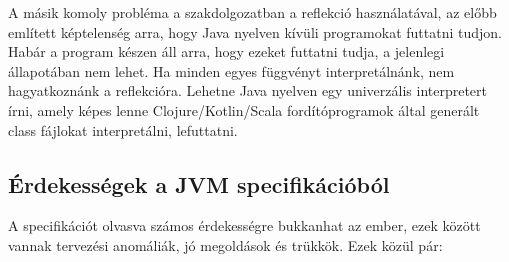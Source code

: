 A másik komoly probléma a szakdolgozatban a reflekció használatával, az előbb említett képtelenség arra, hogy Java nyelven kívüli programokat futtatni tudjon. Habár a program készen áll arra, hogy ezeket futtatni tudja, a jelenlegi állapotában nem lehet. Ha minden egyes függvényt interpretálnánk, nem hagyatkoznánk a reflekcióra. Lehetne Java nyelven egy univerzális interpretert írni, amely képes lenne Clojure/Kotlin/Scala fordítóprogramok által generált class fájlokat interpretálni, lefuttatni.

\subsection{Érdekességek a JVM specifikációból}

A specifikációt olvasva számos érdekességre bukkanhat az ember, ezek között vannak tervezési anomáliák, jó megoldások és trükkök. Ezek közül pár:

